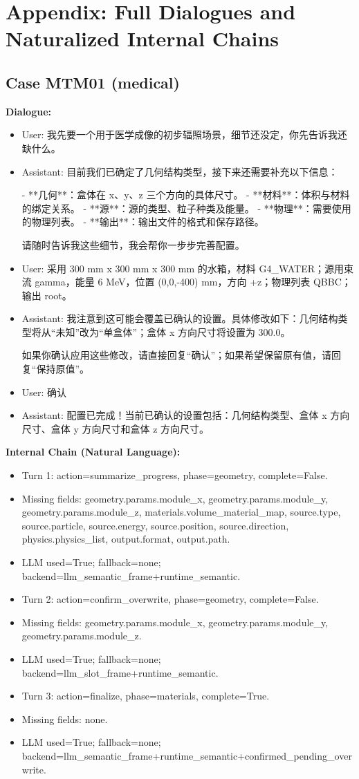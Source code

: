 \documentclass[11pt]{ctexart}
\begin{document}
\section{Appendix: Full Dialogues and Naturalized Internal Chains}
\subsection{Case MTM01 (medical)}
\textbf{Dialogue:}
\begin{itemize}
\item User: 我先要一个用于医学成像的初步辐照场景，细节还没定，你先告诉我还缺什么。
\item Assistant: 目前我们已确定了几何结构类型，接下来还需要补充以下信息：

- **几何**：盒体在 x、y、z 三个方向的具体尺寸。
- **材料**：体积与材料的绑定关系。
- **源**：源的类型、粒子种类及能量。
- **物理**：需要使用的物理列表。
- **输出**：输出文件的格式和保存路径。

请随时告诉我这些细节，我会帮你一步步完善配置。
\item User: 采用 300 mm x 300 mm x 300 mm 的水箱，材料 G4\_WATER；源用束流 gamma，能量 6 MeV，位置 (0,0,-400) mm，方向 +z；物理列表 QBBC；输出 root。
\item Assistant: 我注意到这可能会覆盖已确认的设置。具体修改如下：几何结构类型将从“未知”改为“单盒体”；盒体 x 方向尺寸将设置为 300.0。

如果你确认应用这些修改，请直接回复“确认”；如果希望保留原有值，请回复“保持原值”。
\item User: 确认
\item Assistant: 配置已完成！当前已确认的设置包括：几何结构类型、盒体 x 方向尺寸、盒体 y 方向尺寸和盒体 z 方向尺寸。
\end{itemize}
\textbf{Internal Chain (Natural Language):}
\begin{itemize}
\item Turn 1: action=summarize\_progress, phase=geometry, complete=False.
\item Missing fields: geometry.params.module\_x, geometry.params.module\_y, geometry.params.module\_z, materials.volume\_material\_map, source.type, source.particle, source.energy, source.position, source.direction, physics.physics\_list, output.format, output.path.
\item LLM used=True; fallback=none; backend=llm\_semantic\_frame+runtime\_semantic.
\item Turn 2: action=confirm\_overwrite, phase=geometry, complete=False.
\item Missing fields: geometry.params.module\_x, geometry.params.module\_y, geometry.params.module\_z.
\item LLM used=True; fallback=none; backend=llm\_slot\_frame+runtime\_semantic.
\item Turn 3: action=finalize, phase=materials, complete=True.
\item Missing fields: none.
\item LLM used=True; fallback=none; backend=llm\_semantic\_frame+runtime\_semantic+confirmed\_pending\_overwrite.
\end{itemize}
\end{document}
